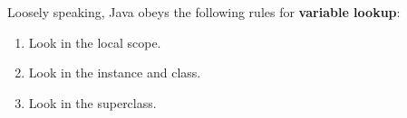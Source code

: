 Loosely speaking, Java obeys the following rules for \textbf{variable lookup}:

\begin{enumerate}
\item Look in the local scope.
\item Look in the instance and class.
\item Look in the superclass.
\end{enumerate}
